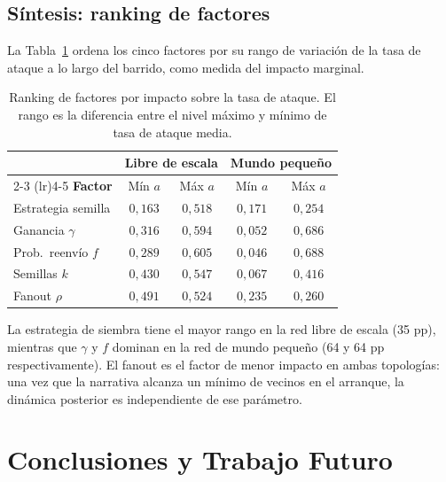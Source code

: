 \documentclass[12pt]{extarticle}
\numberwithin{equation}{section}
\begin{document}
\begin{refsection}
\subsection{Síntesis: ranking de factores}

La Tabla~\ref{tab:ranking} ordena los cinco factores por su rango de variación de la tasa de ataque a lo largo del barrido, como medida del impacto marginal.

\begin{table}[ht]
    \centering
    \small
    \caption{Ranking de factores por impacto sobre la tasa de ataque. El rango es la diferencia entre el nivel máximo y mínimo de tasa de ataque media.}
    \label{tab:ranking}
    \begin{tabular}{@{}l cc cc@{}}
        \toprule
        & \multicolumn{2}{c}{\textbf{Libre de escala}} & \multicolumn{2}{c}{\textbf{Mundo pequeño}} \\
        \cmidrule(lr){2-3} \cmidrule(lr){4-5}
        \textbf{Factor} & Mín $a$ & Máx $a$ & Mín $a$ & Máx $a$ \\
        \midrule
        Estrategia semilla & $0{,}163$ & $0{,}518$ & $0{,}171$ & $0{,}254$ \\
        Ganancia $\gamma$ & $0{,}316$ & $0{,}594$ & $0{,}052$ & $0{,}686$ \\
        Prob.\ reenvío $f$ & $0{,}289$ & $0{,}605$ & $0{,}046$ & $0{,}688$ \\
        Semillas $k$ & $0{,}430$ & $0{,}547$ & $0{,}067$ & $0{,}416$ \\
        Fanout $\rho$ & $0{,}491$ & $0{,}524$ & $0{,}235$ & $0{,}260$ \\
        \bottomrule
    \end{tabular}
\end{table}

La estrategia de siembra tiene el mayor rango en la red libre de escala (35 pp), mientras que $\gamma$ y $f$ dominan en la red de mundo pequeño (64 y 64 pp respectivamente). El fanout es el factor de menor impacto en ambas topologías: una vez que la narrativa alcanza un mínimo de vecinos en el arranque, la dinámica posterior es independiente de ese parámetro.

\newpage

\section{Conclusiones y Trabajo Futuro}\label{sec:conclusion}


\end{refsection}
\end{document}
